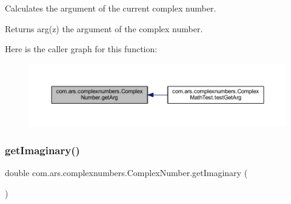 Calculates the argument of the current complex number. \begin{DoxyReturn}{Returns}
arg(z) the argument of the complex number. 
\end{DoxyReturn}
Here is the caller graph for this function\+:\nopagebreak
\begin{figure}[H]
\begin{center}
\leavevmode
\includegraphics[width=350pt]{classcom_1_1ars_1_1complexnumbers_1_1_complex_number_a7cbe3a7d9d1e409b2c00cfd34e95b3e8_icgraph}
\end{center}
\end{figure}
\hypertarget{classcom_1_1ars_1_1complexnumbers_1_1_complex_number_a611fa4712cc691cf1e13e91f182c1850}{}\label{classcom_1_1ars_1_1complexnumbers_1_1_complex_number_a611fa4712cc691cf1e13e91f182c1850} 
\subsubsection{\texorpdfstring{get\+Imaginary()}{getImaginary()}}
{\footnotesize\ttfamily double com.\+ars.\+complexnumbers.\+Complex\+Number.\+get\+Imaginary (\begin{DoxyParamCaption}{ }\end{DoxyParamCaption})}


